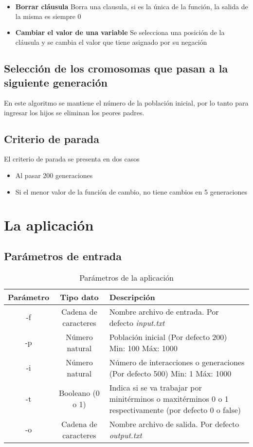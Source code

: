 \documentclass[a4paper]{article}
\begin{document}
\begin{itemize}
	\item \textbf{Borrar cláusula} Borra una clausula, si es la única de la función, la salida de la misma es siempre 0
	\item \textbf{Cambiar el valor de una variable} Se selecciona una posición de la cláusula y se cambia el valor que tiene asignado por su negación
\end{itemize}

\subsection{Selección de los cromosomas que pasan a la siguiente generación}

En este algoritmo se mantiene el número de la población inicial, por lo tanto para ingresar los hijos se eliminan los peores padres.

\subsection{Criterio de parada}

El criterio de parada se presenta en dos casos

\begin{itemize}
	\item Al pasar 200 generaciones
	\item Si el menor valor de la función de cambio, no tiene cambios en 5 generaciones
\end{itemize}

\section{La aplicación}

\subsection{Parámetros de entrada}

\begin{table}[H]
	\centering
	\caption{Parámetros de la aplicación}
	\begin{tabular}{|c|c|p{5cm}|}
		\hline
		\textbf{Parámetro} & \textbf{Tipo dato} & \textbf{Descripción}\\
		\hline
		-f & Cadena de caracteres & Nombre archivo de entrada. Por defecto \textit{input.txt}\\
		\hline
		-p & Número natural & Población inicial (Por defecto 200) Min: 100 Máx: 1000\\
		\hline
		-i & Número natural & Número de interacciones o generaciones (Por defecto 500) Min: 1 Máx: 1000\\
		\hline
		-t & Booleano (0 o 1) & Indica si se va trabajar por minitérminos o maxitérminos 0 o 1 respectivamente (por defecto 0 o false)\\
		\hline
		-o & Cadena de caracteres & Nombre archivo de salida. Por defecto \textit{output.txt} \\
		\hline
	\end{tabular}
\end{table}
\end{document}
